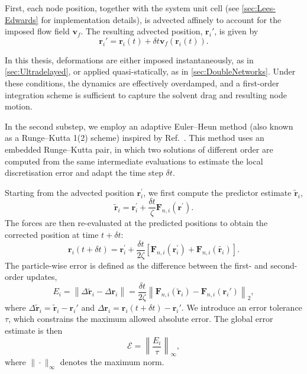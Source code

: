 \documentclass[asymmetricmargins]{library/duthesis}%
\begin{document}
First, each node position, together with the system unit cell (see \cref{sec:Lees-Edwards} for implementation details), is advected affinely to account for the imposed flow field $\bm{v}_f$. The resulting advected position, $\bm{r}_i'$, is given by
\begin{equation*}
    \bm{r}_i' = \bm{r}_i(t) + \delta t \bm{v}_f(\bm{r}_i(t)).
\end{equation*}

In this thesis, deformations are either imposed instantaneously, as in \cref{sec:Ultradelayed}, or applied quasi-statically, as in \cref{sec:DoubleNetworks}. Under these conditions, the dynamics are effectively overdamped, and a first-order integration scheme is sufficient to capture the solvent drag and resulting node motion.

In the second substep, we employ an adaptive Euler--Heun method (also known as a Runge–Kutta 1(2) scheme) inspired by Ref.~\cite{sammullerAdaptiveBrownianDynamics2021}. This method uses an embedded Runge–Kutta pair, in which two solutions of different order are computed from the same intermediate evaluations to estimate the local discretisation error and adapt the time step $\delta t$. 

Starting from the advected position $\bm{r}^\prime_i$, we first compute the predictor estimate $\tilde{\bm{r}}_i$,
\begin{equation*}
    \tilde{\bm{r}}_i = \bm{r}^\prime_i + \frac{\delta t}{\zeta} \bm{F}_{n,i}(\bm{r}^\prime).
\end{equation*}
The forces are then re-evaluated at the predicted positions to obtain the corrected position at time $t+\delta t$:
\begin{equation*}
    \bm{r}_i(t + \delta t) = \bm{r}^\prime_i + \frac{\delta t}{2\zeta} \left[ \bm{F}_{n,i}( \bm{r}^\prime_i ) + \bm{F}_{n,i}(\tilde{\bm{r}_i}) \right].
\end{equation*}
The particle-wise error is defined as the difference between the first- and second-order updates,
\begin{equation*}
    E_i = \left\| \Delta\tilde{\bm{r}}_i - \Delta\bm{r}_i \right\| 
    = \frac{\delta t}{2\zeta}\left\| \bm{F}_{n,i}(\tilde{\bm{r}}_i) - \bm{F}_{n,i}(\bm{r}_i') \right\|_2,
\end{equation*}
where $\Delta\tilde{\bm{r}}_i = \tilde{\bm{r}}_i - \bm{r}_i'$ and $\Delta\bm{r}_i = \bm{r}_i(t+\delta t) - \bm{r}_i'$. We introduce an error tolerance $\tau$, which constrains the maximum allowed absolute error. The global error estimate is then
\begin{equation*}
    \mathcal{E} = \left\| \frac{E_i}{\tau} \right\|_\infty,
\end{equation*}
where $\|\cdot\|_\infty$ denotes the maximum norm.
\end{document}
